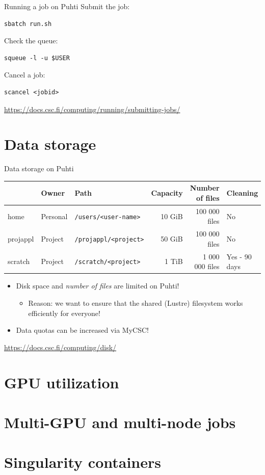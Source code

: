 \documentclass[aspectratio=1610,14pt]{beamer}
\newcommand{\link}[1]{\alert{\url{#1}}}
\begin{document}
\begin{frame}[fragile]{Running a job on Puhti}
  Submit the job:
\begin{verbatim}
sbatch run.sh
\end{verbatim}
  \vfill
  
  Check the queue:
\begin{verbatim}
squeue -l -u $USER
\end{verbatim}
  \vfill
  
  Cancel a job:
\begin{verbatim}
scancel <jobid>
\end{verbatim}

  {\small \link{https://docs.csc.fi/computing/running/submitting-jobs/}}
\end{frame}

\section{Data storage}

\begin{frame}{Data storage on Puhti}
  
  {\footnotesize
    \begin{tabular}{lllrrl}
             & Owner    & Path                      & Capacity & Number of files & Cleaning \\
    \hline
    home     & Personal & {\tt /users/<user-name>}  & 10 GiB   & 100 000 files   & No \\
    projappl & Project  & {\tt /projappl/<project>} & 50 GiB   & 100 000 files   & No \\
    scratch  & Project  & {\tt /scratch/<project>}  & 1 TiB    & 1 000 000 files & Yes - 90 days \\
    \end{tabular}
  }
  \vspace{1em}

  \begin{itemize}
  \item Disk space and \emph{number of files} are limited on Puhti!
    \begin{itemize}
    \item Reason: we want to ensure that the shared (Lustre) filesystem
      works efficiently for everyone!
    \end{itemize}
  \item Data quotas can be increased via MyCSC!
  \end{itemize}

  
  {\small \link{https://docs.csc.fi/computing/disk/}}
\end{frame}

\section{GPU utilization}

\section{Multi-GPU and multi-node jobs}

\section{Singularity containers}
\end{document}
